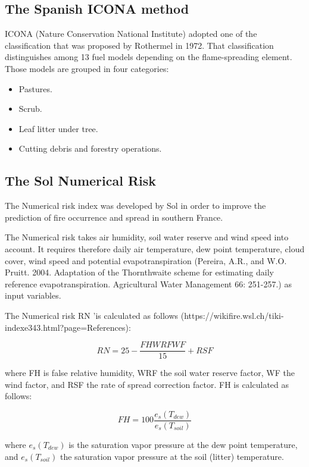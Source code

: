 {{{	\subsection{The Spanish ICONA method}
	
	ICONA (Nature Conservation National Institute) adopted one of the classification that was proposed by Rothermel in 1972. That classification distinguishes among 13 fuel models depending on the flame-spreading element. Those models are grouped in four categories:
	
	\begin{itemize}
		\item Pastures.
		\item Scrub.
		\item Leaf litter under tree.
		\item Cutting debris and forestry operations.
	\end{itemize}
	
	\subsection{The Sol Numerical Risk}
	
	The Numerical risk index was developed by Sol in order to improve the prediction of fire occurrence and spread in southern France.
	
	The Numerical risk takes air humidity, soil water reserve and wind speed into account. It requires therefore daily air temperature, dew point temperature, cloud cover, wind speed and potential evapotranspiration (Pereira, A.R., and W.O. Pruitt. 2004. Adaptation of the Thornthwaite scheme for estimating daily reference evapotranspiration. Agricultural Water Management 66: 251-257.) as input variables.
	
	The Numerical risk RN 'is calculated as follows (https://wikifire.wsl.ch/tiki-indexe343.html?page=References):
	
	\begin{equation}
	RN = 25 - \frac{FH WRF WF}{15} + RSF
	\end{equation}
	
	where FH is false relative humidity, WRF the soil water reserve factor, WF the wind factor, and RSF the rate of spread correction factor. FH is calculated as follows:
	
	\begin{equation}
	FH = 100 \frac{e_{s}(T_{dew})}{e_{s}(T_{soil})}
	\end{equation}
	
	where $e_{s}(T_{dew})$ is the saturation vapor pressure at the dew point temperature, and $e_{s}(T_{soil})$ the saturation vapor pressure at the soil (litter) temperature.
	
}}}
